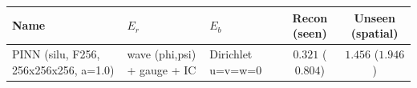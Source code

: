 \begin{center}
\begin{tabular}{lll cc}
\toprule
Name & $E_r$ & $E_b$ & Recon (seen) & Unseen (spatial) \\
\midrule
PINN (silu, F256, 256x256x256, a=1.0) & wave (phi,psi) + gauge + IC & Dirichlet u=v=w=0 & $0.321$ ($0.804$) & $1.456$ ($1.946$) \\
\bottomrule
\end{tabular}
\end{center}
